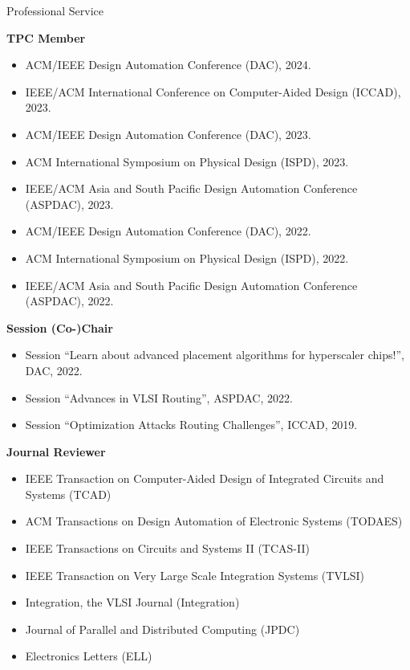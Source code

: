 
\begin{rSection}{Professional Service}

\textbf{TPC Member}
\begin{itemize}
    \item ACM/IEEE Design Automation Conference (DAC), 2024.
    \item IEEE/ACM International Conference on Computer-Aided Design (ICCAD), 2023.
    \item ACM/IEEE Design Automation Conference (DAC), 2023.
    \item ACM International Symposium on Physical Design (ISPD), 2023.
    \item IEEE/ACM Asia and South Pacific Design Automation Conference (ASPDAC), 2023.
    \item ACM/IEEE Design Automation Conference (DAC), 2022.
    \item ACM International Symposium on Physical Design (ISPD), 2022.
    \item IEEE/ACM Asia and South Pacific Design Automation Conference (ASPDAC), 2022.
\end{itemize}

\textbf{Session (Co-)Chair}
\begin{itemize}
    \item Session ``Learn about advanced placement algorithms for hyperscaler chips!'', DAC, 2022.
    \item Session ``Advances in VLSI Routing'', ASPDAC, 2022.
    \item Session ``Optimization Attacks Routing Challenges'', ICCAD, 2019.
\end{itemize}

\textbf{Journal Reviewer}
\begin{itemize}
    \item IEEE Transaction on Computer-Aided Design of Integrated Circuits and Systems (TCAD)
    \item ACM Transactions on Design Automation of Electronic Systems (TODAES)
    \item IEEE Transactions on Circuits and Systems II (TCAS-II)
    \item IEEE Transaction on Very Large Scale Integration Systems (TVLSI)
    \item Integration, the VLSI Journal (Integration)
    \item Journal of Parallel and Distributed Computing (JPDC)
    \item Electronics Letters (ELL)
\end{itemize}


\end{rSection}
